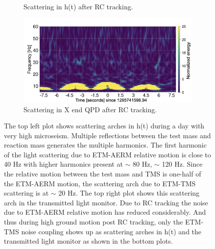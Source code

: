 \documentclass[12pt]{iopart}
\begin{document}
\begin{figure}[h]
\begin{subfigure}[b]{0.45\textwidth}
         \caption{Scattering in h(t) after RC tracking.}
         \label{fig:1265darm}
    \end{subfigure}
    \begin{subfigure}[b]{0.45\textwidth}
        \centering
         \includegraphics[width =\textwidth]{post_r0_transomeg2.png}
         \caption{Scattering in X end QPD after RC tracking.}
         \label{fig:1265trans}
     \end{subfigure}
     
     
    \caption{The top left plot shows scattering arches in h(t) during a day with very high microseism. Multiple reflections between the test mass and reaction mass generates the multiple harmonics. The first harmonic of the light scattering due to ETM-AERM relative motion is close to 40 Hz with higher harmonics present at $\sim$ 80 Hz, $\sim$ 120 Hz. Since the relative motion between the test mass and TMS is one-half of the ETM-AERM motion, the scattering arch due to ETM-TMS scattering is at $\sim$ 20 Hz. The top right plot shows this scattering arch in the transmitted light monitor. Due to RC tracking the noise due to ETM-AERM relative motion has reduced considerably. And thus during high ground motion post RC tracking, only the ETM-TMS noise coupling shows up as scattering arches in h(t) and the transmitted light monitor as shown in the bottom plots.}
    \label{fig:1262scat}
    
\end{figure}
\end{document}

